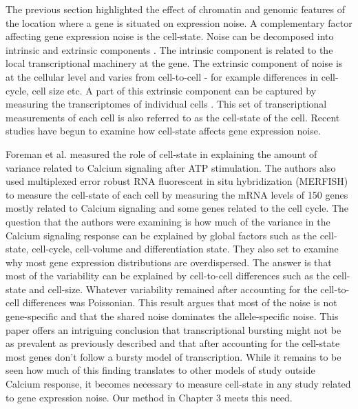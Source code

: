 The previous section highlighted the effect of chromatin and genomic features of the location where a gene is situated on expression noise. A complementary factor affecting gene expression noise is the cell-state. Noise can be decomposed into intrinsic and extrinsic components \cite{swain2002pnas} \cite{raser_noise_2005}. The intrinsic component is related to the local transcriptional machinery at the gene. The extrinsic component of noise is at the cellular level and varies from cell-to-cell - for example differences in cell-cycle, cell size etc. A part of this extrinsic component can be captured by measuring the transcriptomes of individual cells \cite{macosko2015c}. This set of transcriptional measurements of each cell is also referred to as the cell-state of the cell. Recent studies have begun to examine how cell-state affects gene expression noise.

Foreman et al. \cite{foreman_mammalian_2019} measured the role of cell-state in explaining the amount of variance related to Calcium signaling after ATP stimulation. The authors also used multiplexed error robust RNA fluorescent in situ hybridization (MERFISH) to measure the cell-state of each cell by measuring the mRNA levels of 150 genes mostly related to Calcium signaling and some genes related to the cell cycle. The question that the authors were examining is how much of the variance in the Calcium signaling response can be explained by global factors such as the cell-state, cell-cycle, cell-volume and differentiation state. They also set to examine why most gene expression distributions are overdispersed. The answer is that most of the variability can be explained by cell-to-cell differences such as the cell-state and cell-size. Whatever variability remained after accounting for the cell-to-cell differences was Poissonian. This result argues that most of the noise is not gene-specific and that the shared noise dominates the allele-specific noise. This paper offers an intriguing conclusion that transcriptional bursting might not be as prevalent as previously described and that after accounting for the cell-state most genes don't follow a bursty model of transcription. While it remains to be seen how much of this finding translates to other models of study outside Calcium response, it becomes necessary to measure cell-state in any study related to gene expression noise. Our method in Chapter 3 meets this need.

